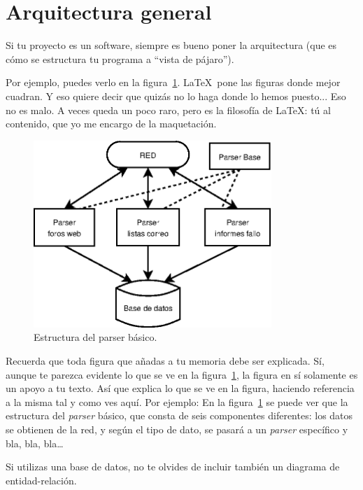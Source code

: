 \documentclass[a4paper, 12pt]{book}
\begin{document}
\section{Arquitectura general} 
\label{sec:arquitectura}

Si tu proyecto es un software, siempre es bueno poner la arquitectura (que es cómo se estructura tu programa a ``vista de pájaro'').

Por ejemplo, puedes verlo en la figura~\ref{fig:arquitectura}.
\LaTeX \ pone las figuras donde mejor cuadran. 
Y eso quiere decir que quizás no lo haga donde lo hemos puesto...
Eso no es malo.
A veces queda un poco raro, pero es la filosofía de \LaTeX: tú al contenido, que yo me encargo de la maquetación.

\begin{figure}
  \centering
  \includegraphics[width=9cm, keepaspectratio]{img/arquitectura}
  \caption{Estructura del parser básico.}
  \label{fig:arquitectura}
\end{figure}

Recuerda que toda figura que añadas a tu memoria debe ser explicada.
Sí, aunque te parezca evidente lo que se ve en la figura~\ref{fig:arquitectura}, la figura en sí solamente es un apoyo a tu texto.
Así que explica lo que se ve en la figura, haciendo referencia a la misma tal y como ves aquí.
Por ejemplo: En la figura~\ref{fig:arquitectura} se puede ver que la estructura del \emph{parser} básico, que consta de seis componentes diferentes: los datos se obtienen de la red, y según el tipo de dato, se pasará a un \emph{parser} específico y bla, bla, bla\ldots

Si utilizas una base de datos, no te olvides de incluir también un diagrama de entidad-relación.


\end{document}
